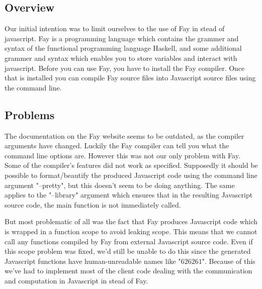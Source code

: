 \subsection{Overview}
Our initial intention was to limit ourselves to the use of Fay \cite{Fay} in
stead of javascript. Fay is a programming language which contains the grammer
and syntax of the functional programming language Haskell, and some additional
grammer and syntax which enables you to store variables and interact with
javascript. Before you can use Fay, you have to install the Fay compiler. Once
that is installed you can compile Fay source files into Javascript source files
using the command line. 

\subsection{Problems}
The documentation on the Fay website seems to be
outdated, as the compiler arguments have changed. Luckily the Fay compiler can
tell you what the command line options are. However this was not our only
problem with Fay. Some of the compiler's features did not work as specified.
Supposedly it should be possible to format/beautify the produced Javascript code
using the command line argument "--pretty", but this doesn't seem to be doing
anything. The same applies to the "--library" argument which ensures that in the
resulting Javascript source code, the main function is not immediately called.

But most problematic of all was the fact that Fay produces Javascript code which
is wrapped in a function scope to avoid leaking scope. This means that we cannot
call any functions compiled by Fay from external Javascript source code. Even if
this scope problem was fixed, we'd still be unable to do this since the
generated Javascript functions have human-unreadable names like "$62$$62$$61$".
Because of this we've had to implement most of the client code dealing with the
communication and computation in Javascript in stead of Fay.
